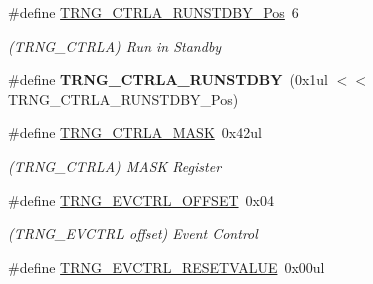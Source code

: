 \begin{DoxyCompactItemize}
\item 
\hypertarget{group___s_a_m_l21___t_r_n_g_ga2334f5ecebaf9f297449a40e4261fba0}{}\#define \hyperlink{group___s_a_m_l21___t_r_n_g_ga2334f5ecebaf9f297449a40e4261fba0}{T\+R\+N\+G\+\_\+\+C\+T\+R\+L\+A\+\_\+\+R\+U\+N\+S\+T\+D\+B\+Y\+\_\+\+Pos}~6\label{group___s_a_m_l21___t_r_n_g_ga2334f5ecebaf9f297449a40e4261fba0}

\begin{DoxyCompactList}\small\item\em (T\+R\+N\+G\+\_\+\+C\+T\+R\+L\+A) Run in Standby \end{DoxyCompactList}\item 
\hypertarget{group___s_a_m_l21___t_r_n_g_gae314ce4f80d2dd8f0c36942c2cb36e76}{}\#define {\bfseries T\+R\+N\+G\+\_\+\+C\+T\+R\+L\+A\+\_\+\+R\+U\+N\+S\+T\+D\+B\+Y}~(0x1ul $<$$<$ T\+R\+N\+G\+\_\+\+C\+T\+R\+L\+A\+\_\+\+R\+U\+N\+S\+T\+D\+B\+Y\+\_\+\+Pos)\label{group___s_a_m_l21___t_r_n_g_gae314ce4f80d2dd8f0c36942c2cb36e76}

\item 
\hypertarget{group___s_a_m_l21___t_r_n_g_ga2d98bbfc5f1991d4742bc48223252d3d}{}\#define \hyperlink{group___s_a_m_l21___t_r_n_g_ga2d98bbfc5f1991d4742bc48223252d3d}{T\+R\+N\+G\+\_\+\+C\+T\+R\+L\+A\+\_\+\+M\+A\+S\+K}~0x42ul\label{group___s_a_m_l21___t_r_n_g_ga2d98bbfc5f1991d4742bc48223252d3d}

\begin{DoxyCompactList}\small\item\em (T\+R\+N\+G\+\_\+\+C\+T\+R\+L\+A) M\+A\+S\+K Register \end{DoxyCompactList}\item 
\hypertarget{group___s_a_m_l21___t_r_n_g_gadaefe3b9d37d246fad0c6fc47c1cfa42}{}\#define \hyperlink{group___s_a_m_l21___t_r_n_g_gadaefe3b9d37d246fad0c6fc47c1cfa42}{T\+R\+N\+G\+\_\+\+E\+V\+C\+T\+R\+L\+\_\+\+O\+F\+F\+S\+E\+T}~0x04\label{group___s_a_m_l21___t_r_n_g_gadaefe3b9d37d246fad0c6fc47c1cfa42}

\begin{DoxyCompactList}\small\item\em (T\+R\+N\+G\+\_\+\+E\+V\+C\+T\+R\+L offset) Event Control \end{DoxyCompactList}\item 
\hypertarget{group___s_a_m_l21___t_r_n_g_ga54cb5b275f86031bc4422cb4f99da9f3}{}\#define \hyperlink{group___s_a_m_l21___t_r_n_g_ga54cb5b275f86031bc4422cb4f99da9f3}{T\+R\+N\+G\+\_\+\+E\+V\+C\+T\+R\+L\+\_\+\+R\+E\+S\+E\+T\+V\+A\+L\+U\+E}~0x00ul\label{group___s_a_m_l21___t_r_n_g_ga54cb5b275f86031bc4422cb4f99da9f3}


\end{DoxyCompactItemize}
